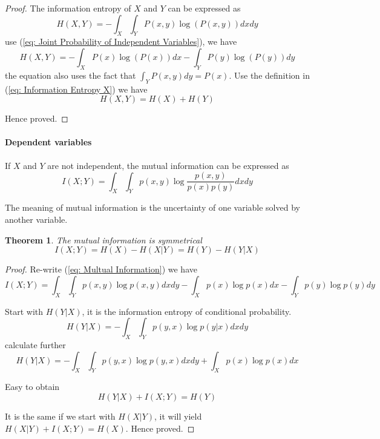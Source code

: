 \documentclass[a4paper]{article}
\newtheorem{theorem}{Theorem}[section]
\begin{document}
\begin{proof}
    The information entropy of $X$ and $Y$ can be expressed as
    \begin{equation}
        H(X, Y) = - \int_{X} \int_{Y} P(x, y) \log(P(x, y)) dx dy
    \end{equation}
    use (\ref{eq: Joint Probability of Independent Variables}), we have
    \begin{equation}
        H(X, Y) = - \int_{X} P(x) \log(P(x)) dx - \int_{Y} P(y) \log(P(y)) dy
    \end{equation}
    the equation also uses the fact that $\int_{Y} P(x, y) dy = P(x)$.
    Use the definition in (\ref{eq: Information Entropy X}) we have
    \begin{equation*}
        H(X, Y) = H(X) + H(Y)
    \end{equation*}

    Hence proved.
\end{proof}

\paragraph{Dependent variables}
If $X$ and $Y$ are not independent, the mutual information can be expressed as
\begin{equation}
    I(X; Y) = \int_{X} \int_{Y} p(x, y) \log{\frac{p(x, y)}{p(x)p(y)} dx dy}
    \label{eq: Multual Information}
\end{equation}

The meaning of mutual information is the uncertainty of one variable solved by another variable.

\begin{theorem}
    The mutual information is symmetrical
    \begin{equation}
        I(X; Y) = H(X) - H(X|Y) = H(Y) - H(Y|X)
    \end{equation}
\end{theorem}

\begin{proof}
    Re-write (\ref{eq: Multual Information}) we have
    \begin{equation*}
        I(X; Y) = \int_{X} \int_{Y} p(x, y) \log{p(x, y)} dx dy - \int_{X} p(x) \log{p(x)} dx - \int_{Y} p(y) \log{p(y) dy}
    \end{equation*}

    Start with $H(Y|X)$, it is the information entropy of conditional probability.
    \begin{equation*}
        H(Y|X) = - \int_{X} \int_{Y} p(y, x) \log{p(y|x)} dx dy
    \end{equation*}
    calculate further
    \begin{equation*}
        H(Y|X) = - \int_{X} \int_{Y} p(y, x) \log{p(y, x)} dx dy + \int_{X} p(x) \log{p(x)} dx
    \end{equation*}

    Easy to obtain
    \begin{equation*}
        H(Y|X) + I(X; Y) = H(Y)
    \end{equation*}

    It is the same if we start with $H(X|Y)$, it will yield $H(X|Y) + I(X; Y) = H(X)$.
    Hence proved.
\end{proof}
\end{document}
